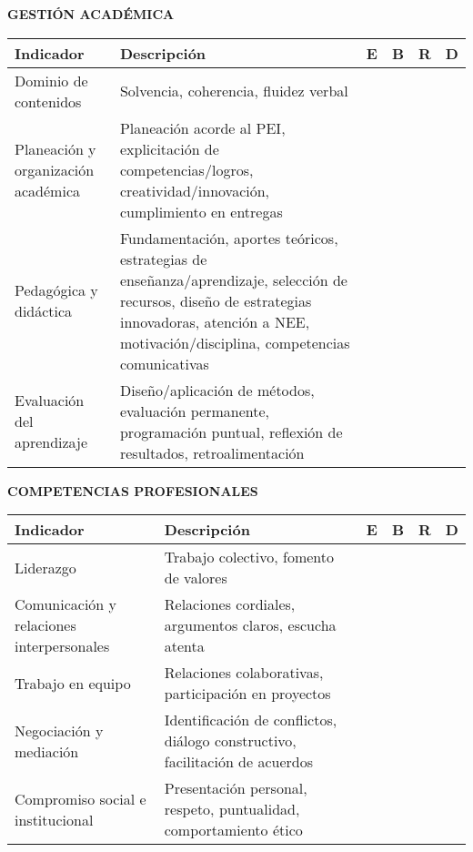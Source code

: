 \documentclass[a4paper,12pt]{article}
\begin{document}
\vspace{0.5cm}
\noindent
\textbf{GESTIÓN ACADÉMICA}
\begin{table}[h]
    \centering
    \scriptsize %
    \begin{tabularx}{\textwidth}{|p{5cm}|X|c|c|c|c|}
        \hline
        \textbf{Indicador} & \textbf{Descripción} & \textbf{E} & \textbf{B} & \textbf{R} & \textbf{D} \\
        \hline
        Dominio de contenidos & Solvencia, coherencia, fluidez verbal & & & & \\
        \hline
        Planeación y organización académica & Planeación acorde al PEI, explicitación de competencias/logros, creatividad/innovación, cumplimiento en entregas & & & & \\
        \hline
        Pedagógica y didáctica & Fundamentación, aportes teóricos, estrategias de enseñanza/aprendizaje, selección de recursos, diseño de estrategias innovadoras, atención a NEE, motivación/disciplina, competencias comunicativas & & & & \\
        \hline
        Evaluación del aprendizaje & Diseño/aplicación de métodos, evaluación permanente, programación puntual, reflexión de resultados, retroalimentación & & & & \\
        \hline
    \end{tabularx}
\end{table}

\vspace{0.5cm}
\noindent
\textbf{COMPETENCIAS PROFESIONALES}
\begin{table}[h]
    \centering
    \scriptsize
    \begin{tabularx}{\textwidth}{|p{5cm}|X|c|c|c|c|}
        \hline
        \textbf{Indicador} & \textbf{Descripción} & \textbf{E} & \textbf{B} & \textbf{R} & \textbf{D} \\
        \hline
        Liderazgo & Trabajo colectivo, fomento de valores & & & & \\
        \hline
        Comunicación y relaciones interpersonales & Relaciones cordiales, argumentos claros, escucha atenta & & & & \\
        \hline
        Trabajo en equipo & Relaciones colaborativas, participación en proyectos & & & & \\
        \hline
        Negociación y mediación & Identificación de conflictos, diálogo constructivo, facilitación de acuerdos & & & & \\
        \hline
        Compromiso social e institucional & Presentación personal, respeto, puntualidad, comportamiento ético & & & & \\
        \hline
    \end{tabularx}
\end{table}
\end{document}
